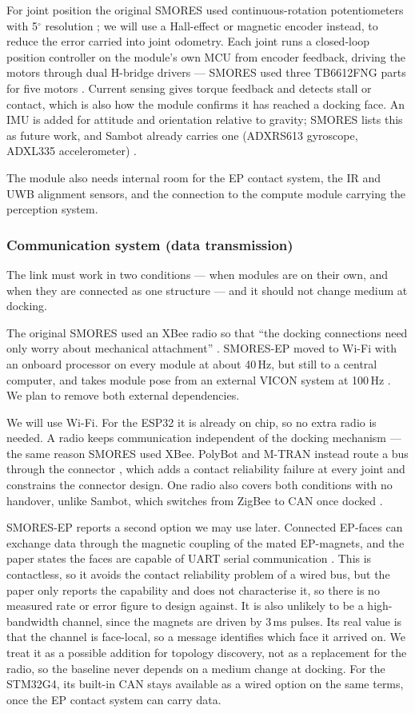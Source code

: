 \documentclass[11pt,a4paper]{article}
\newcounter{gsub}
\newcommand{\gsubsub}[1]{\subsubsection*{#1}}
\begin{document}
For joint position the original SMORES used continuous-rotation potentiometers
with 5$^\circ$ resolution \cite{davey2012}; we will use a Hall-effect or
magnetic encoder instead, to reduce the error carried into joint odometry. Each
joint runs a closed-loop position controller on the module's own MCU from
encoder feedback, driving the motors through dual H-bridge drivers --- SMORES
used three TB6612FNG parts for five motors \cite{davey2012}. Current sensing
gives torque feedback and detects stall or contact, which is also how the
module confirms it has reached a docking face. An IMU is added for attitude and
orientation relative to gravity; SMORES lists this as future work, and Sambot
already carries one (ADXRS613 gyroscope, ADXL335 accelerometer)
\cite{wei2011}.

The module also needs internal room for the EP contact system, the IR and UWB
alignment sensors, and the connection to the compute module carrying the
perception system.

\gsubsub{Communication system (data transmission)}

The link must work in two conditions --- when modules are on their own, and
when they are connected as one structure --- and it should not change medium at
docking.

The original SMORES used an XBee radio so that ``the docking connections need
only worry about mechanical attachment'' \cite{davey2012}. SMORES-EP moved to
Wi-Fi with an onboard processor on every module at about 40\,Hz, but still to a
central computer, and takes module pose from an external VICON system at
100\,Hz \cite{liu2023}. We plan to remove both external dependencies.

We will use Wi-Fi. For the ESP32 it is already on chip, so no extra radio is
needed. A radio keeps communication independent of the docking mechanism ---
the same reason SMORES used XBee. PolyBot and M-TRAN instead route a bus
through the connector \cite{yim2003,murata2002}, which adds a contact
reliability failure at every joint and constrains the connector design. One
radio also covers both conditions with no handover, unlike Sambot, which
switches from ZigBee to CAN once docked \cite{wei2011}.

SMORES-EP reports a second option we may use later. Connected EP-faces can
exchange data through the magnetic coupling of the mated EP-magnets, and the
paper states the faces are capable of UART serial communication
\cite{tosun2016}. This is contactless, so it avoids the contact reliability
problem of a wired bus, but the paper only reports the capability and does not
characterise it, so there is no measured rate or error figure to design
against. It is also unlikely to be a high-bandwidth channel, since the magnets
are driven by 3\,ms pulses. Its real value is that the channel is face-local,
so a message identifies which face it arrived on. We treat it as a possible
addition for topology discovery, not as a replacement for the radio, so the
baseline never depends on a medium change at docking. For the STM32G4, its
built-in CAN stays available as a wired option on the same terms, once the EP
contact system can carry data.
\end{document}
